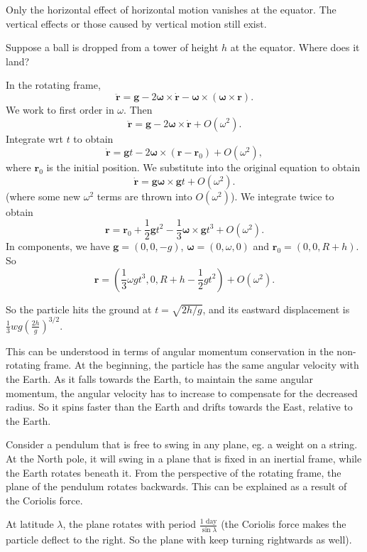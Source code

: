 \documentclass[a4paper]{article}
\begin{document}
\note Only the horizontal effect of horizontal motion vanishes at the equator. The vertical effects or those caused by vertical motion still exist.

\begin{eg}
  Suppose a ball is dropped from a tower of height $h$ at the equator. Where does it land?

  In the rotating frame,
  \[
    \ddot{\mathbf{r}} = \mathbf{g} - 2\boldsymbol\omega\times \dot{\mathbf{r}} - \boldsymbol\omega\times(\boldsymbol\omega\times \mathbf{r}).
  \]
  We work to first order in $\omega$. Then
  \[
    \ddot{\mathbf{r}} = \mathbf{g} - 2\boldsymbol\omega\times \dot{\mathbf{r}} + O(\omega^2).
  \]
  Integrate wrt $t$ to obtain
  \[
    \dot{\mathbf{r}} = \mathbf{g}t - 2\boldsymbol\omega \times (\mathbf{r} - \mathbf{r}_0) + O(\omega^2),
  \]
  where $\mathbf{r}_0$ is the initial position. We substitute into the original equation to obtain
  \[
    \dot{\mathbf{r}} = \mathbf{g}\boldsymbol\omega\times \mathbf{g}t + O(\omega^2).
  \]
  (where some new $\omega^2$ terms are thrown into $O(\omega^2)$). We integrate twice to obtain
  \[
    \mathbf{r} = \mathbf{r}_0 + \frac{1}{2}\mathbf{g}t^2 - \frac{1}{3}\boldsymbol\omega \times \mathbf{g}t^3 + O(\omega^2).
  \]
  In components, we have $\mathbf{g} = (0, 0, -g)$, $\boldsymbol\omega = (0, \omega, 0)$ and $\mathbf{r}_0 = (0, 0, R + h)$. So
  \[
    \mathbf{r} = \left(\frac{1}{3}\omega gt^3, 0, R + h - \frac{1}{2}gt^2\right) + O(\omega^2).
  \]

  So the particle hits the ground at $t = \sqrt{2h/g}$, and its eastward displacement is $\frac{1}{3}wg\left(\frac{2h}{g}\right)^{3/2}$.

  This can be understood in terms of angular momentum conservation in the non-rotating frame. At the beginning, the particle has the same angular velocity with the Earth. As it falls towards the Earth, to maintain the same angular momentum, the angular velocity has to increase to compensate for the decreased radius. So it spins faster than the Earth and drifts towards the East, relative to the Earth.
\end{eg}

\begin{eg}
  Consider a pendulum that is free to swing in any plane, eg. a weight on a string. At the North pole, it will swing in a plane that is fixed in an inertial frame, while the Earth rotates beneath it. From the perspective of the rotating frame, the plane of the pendulum rotates backwards. This can be explained as a result of the Coriolis force.

  At latitude $\lambda$, the plane rotates with period $\frac{1\text{ day}}{\sin \lambda}$ (the Coriolis force makes the particle deflect to the right. So the plane with keep turning rightwards as well).
\end{eg}
\end{document}
